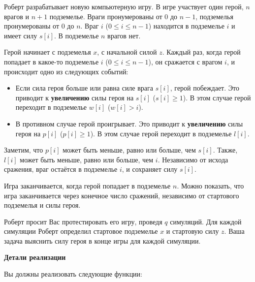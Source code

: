 Роберт разрабатывает новую компьютерную игру. В игре участвует один герой, $n$ врагов и $n+1$ подземелье. Враги пронумерованы от $0$ до $n-1$, подземелья пронумерованы от $0$ до $n$. Враг $i$ ($0 \leq i \leq n-1$) находится в подземелье $i$ и имеет силу $s[i]$. В подземелье $n$ врагов нет.

Герой начинает с подземелья $x$, с начальной силой $z$.
Каждый раз, когда герой попадает в какое-то подземелье $i$ ($0 \leq i \leq n-1$), он сражается с врагом $i$, и происходит одно из следующих событий:
\begin{itemize}
\item Если сила героя больше или равна силе врага $s[i]$, герой побеждает. Это приводит к \textbf{увеличению} силы героя на $s[i]$ ($s[i] \geq 1$). В этом случае герой переходит в подземелье $w[i]$ ($w[i] > i$).

\item В противном случае герой проигрывает. Это приводит к  \textbf{увеличению} силы героя на $p[i]$ ($p[i] \geq 1$). В этом случае герой переходит в подземелье $l[i]$.
\end{itemize}


Заметим, что $p[i]$ может быть меньше, равно или больше, чем $s[i]$. Также, 
$l[i]$ может быть меньше, равно или больше, чем $i$.
Независимо от исхода сражения, враг остаётся в подземелье $i$, и сохраняет силу $s[i]$.

Игра заканчивается, когда герой попадает в подземелье $n$.
Можно показать, что игра заканчивается через конечное число сражений, независимо от стартового подземелья и силы героя.

Роберт просит Вас протестировать его игру, проведя $q$ симуляций.
Для каждой симуляции Роберт определил стартовое подземелье $x$ и стартовую силу $z$.
Ваша задача выяснить силу героя в конце игры для каждой симуляции.


\textbf{Детали реализации}

Вы должны реализовать следующие функции:

